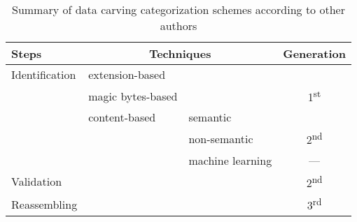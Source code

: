 \begin{table*}[!ht]
    \centering
    \caption[Summary of data carving categorization schemes]{Summary of data carving categorization schemes according to other authors}
    \label{tab:categories}
    \begin{tabular}{ l | l | l | c }
      Steps & \multicolumn{2}{|c|}{Techniques}                  & Generation\\
      \hline\hline
      Identification    & extension-based   &                   &   \\
                        \cline{2-3}
                        & magic bytes-based &                   & \multirow{-2}{*}{1\textsuperscript{st}}\\
                        \cline{2-4}
                        & content-based     & semantic          &   \\
                                            \cline{3-3}
                        &                   & non-semantic      & \multirow{-2}{*}{2\textsuperscript{nd}}\\
                                            \cline{3-4}
                        &                   & machine learning  &  --- \\
      \hline
      Validation        &                   &                   & 2\textsuperscript{nd} \\
      \hline
      Reassembling      &                   &                   & 3\textsuperscript{rd}\\
      \hline
    \end{tabular}
\end{table*}

